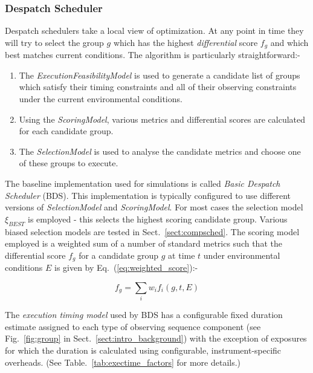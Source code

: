 \subsubsection{Despatch Scheduler}
\label{ss:sched_bds}
Despatch schedulers take a local view of optimization. At any point in time they will try to select the group $g$ which has the highest \emph{differential} score $f_g$ and which best matches current conditions. The algorithm is particularly straightforward:-

\begin{enumerate} 
\item The \emph{ExecutionFeasibilityModel} is used to generate a candidate list of groups which satisfy their timing constraints and all of their observing constraints under the current environmental conditions.

\item Using the \emph{ScoringModel}, various metrics and differential scores are calculated for each candidate group. 

\item The \emph{SelectionModel} is used to analyse the candidate metrics and choose one of these groups to execute.
\end{enumerate}

The baseline implementation used for simulations is called \emph{Basic Despatch Scheduler} (BDS). This implementation is typically configured to use different versions of \emph{SelectionModel} and \emph{ScoringModel}. For most cases the selection model $\xi_{BEST}$ is employed - this selects the highest scoring candidate group. Various biased selection models are tested in Sect.~\ref{sect:compsched}. The scoring model employed is a weighted sum of a number of standard metrics such that the differential score $f_g$ for a candidate group $g$ at time $t$ under environmental conditions $E$ is given by Eq.~(\ref{eq:weighted_score}):-

\begin{equation}
\label{eq:weighted_score}
f_g = \sum_{i} {w_i f_i(g,t,E)}
\end{equation}

The \emph{execution timing model} used by BDS has a configurable fixed duration estimate assigned to each type of observing sequence component (see Fig.~\ref{fig:group} in Sect.~\ref{sect:intro_background}) with the exception of exposures for which the duration is calculated using configurable, instrument-specific overheads. (See Table.~\ref{tab:exectime_factors} for more details.)


